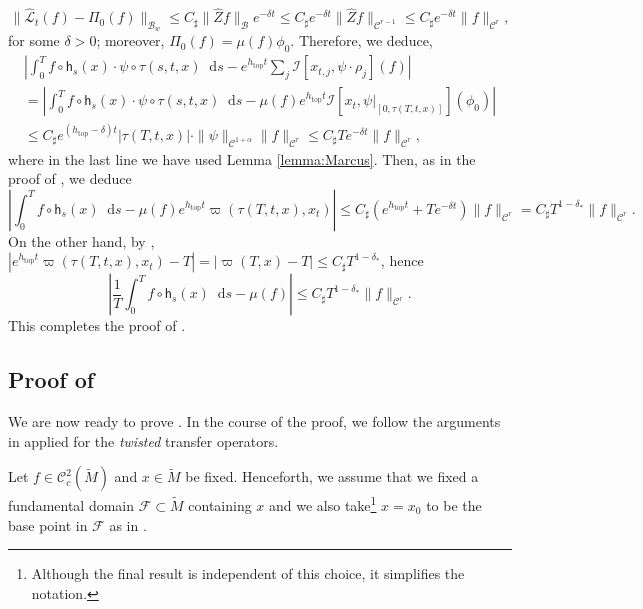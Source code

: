\documentclass[11pt,letterpaper]{amsart}
\newcommand \cF {{\mathcal F}}
\newcommand \cL {{\mathcal L}}
\newcommand \tM {{\widetilde M}}
\newcommand \cB {{\mathscr B}}
\newcommand \cC {{\mathscr{C}}}
\newcommand \sC {{C_\sharp}}
\newcommand{\horo}{\mathsf{h}}
\newcommand*{\diff}{\mathop{}\!\mathrm{d}}
\DeclareMathOperator{\topp}{top}
\theoremstyle{definition}
\begin{document}
\[
\| \hat{ \cL}_{t} (f) - \Pi_0(f)\|_{\cB_w} \leq \sC \|\hat{Z}f \|_{\cB}e^{-\delta t} \leq \sC e^{-\delta t}\|\hat Z f\|_{\cC^{r-1}}\le \sC e^{-\delta t}\|f\|_{\cC^r},
\]
for some $\delta >0$; moreover, $\Pi_0(f) = \mu(f) \phi_0$. Therefore, we deduce,
\begin{multline*}
\left\lvert \int_{0}^{T} f \circ \horo_s(x) \cdot \psi \circ \tau(s,t,x) \diff s - e^{h_{\topp}t} \sum_j \mathcal{I}[x_{t,j},\psi \cdot \rho_j](f)\right\rvert \\
=\left\lvert \int_{0}^{T} f \circ \horo_s(x) \cdot \psi \circ \tau(s,t,x) \diff s - \mu(f)e^{h_{\topp}t}  \mathcal{I}[x_{t},\psi|_{[0,\tau(T,t,x)]}](\phi_0)  \right\rvert \\
\leq \sC e^{(h_{\topp}-\delta) t} |\tau(T,t,x)| \cdot \|\psi\|_{\mathscr{C}^{1+\alpha}}\|f\|_{\cC^r}\leq \sC T e^{-\delta t}\|f\|_{\cC^r},
\end{multline*}
where in the last line we have used Lemma \ref{lemma:Marcus}.
Then, as in the proof of , we deduce 
\[
\left\lvert  \int_0^T f\circ \horo_s(x)\diff s - \mu(f)e^{h_{\topp}t} \varpi(\tau(T,t,x),x_t) \right\rvert \leq \sC (e^{h_{\topp}t} +T e^{-\delta t})\|f\|_{\cC^r} =  \sC  T^{1-\delta_{\ast}} \|f\|_{\cC^r}.
\]
On the other hand, by , $|e^{h_{\topp}t} \varpi(\tau(T,t,x),x_t)-T| =|\varpi(T,x)-T| \le \sC T^{1-\delta_{\ast}}$, hence
\[
\left\lvert \frac 1T \int_0^T f\circ \horo_s(x)\diff s - \mu(f) \right\rvert \leq \sC  T^{1-\delta_{\ast}} \|f\|_{\cC^r}.
\]
This completes the proof of .





\subsection{Proof of }\label{sec:proof_main_result}

We are now ready to prove . In the course of the proof, we follow the arguments in  applied for the \emph{twisted} transfer operators.

Let $f \in \mathscr{C}^{2}_c(\tM)$ and $x \in \tM$ be fixed. Henceforth, we assume that we fixed a fundamental domain $\cF \subset \tM$ containing $x$ and we also take\footnote{Although the final result is independent of this choice, it simplifies the notation.} $x=x_0$ to be the base point in $\cF$ as in .
\end{document}
